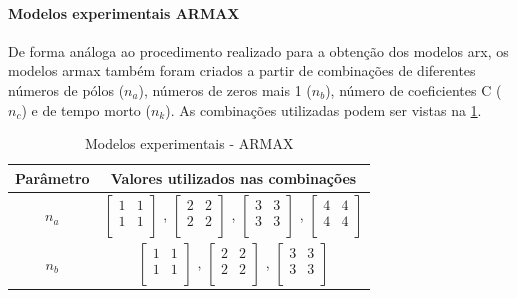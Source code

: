 \paragraph*{\textbf{Modelos experimentais ARMAX}}
\label{par:modelos_experimentais_armax}

De forma análoga ao procedimento realizado para a obtenção dos modelos \acrshort{arx}, os modelos
\acrshort{armax} também foram criados a partir de combinações de diferentes números de pólos ($n_a$),
números de zeros mais 1 ($n_b$), número de coeficientes C ($n_c$) e de tempo morto ($n_k$).
As combinações utilizadas podem ser vistas na \cref{tab:tclabsp-models-armax}.

\begin{table}[h]
	\centering
	\caption{Modelos experimentais - ARMAX}
	\label{tab:tclabsp-models-armax}
	\begin{tabular}{c|c} \toprule
		{Parâmetro}		&	{Valores utilizados nas combinações}									\\ \midrule
		$n_a$			&
							$ \begin{bmatrix}	1	&	1	\\	1	&	1	\\	\end{bmatrix} $	,		
							$ \begin{bmatrix}	2	&	2	\\	2	&	2	\\	\end{bmatrix} $	,		
							$ \begin{bmatrix}	3	&	3	\\	3	&	3	\\	\end{bmatrix} $	,		
							$ \begin{bmatrix}	4	&	4	\\	4	&	4	\\	\end{bmatrix} $		\\ \midrule
		$n_b$			&
							$ \begin{bmatrix}	1	&	1	\\	1	&	1	\\	\end{bmatrix} $	,		
							$ \begin{bmatrix}	2	&	2	\\	2	&	2	\\	\end{bmatrix} $	,		
							$ \begin{bmatrix}	3	&	3	\\	3	&	3	\\	\end{bmatrix} $		\\ \midrule

\end{tabular}
\end{table}
